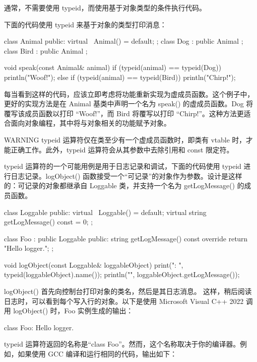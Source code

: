 通常，不需要使用 typeid，而使用基于对象类型的条件执行代码。

下面的代码使用 typeid 来基于对象的类型打印消息：

\begin{cpp}
class Animal { public: virtual ~Animal() = default; };
class Dog : public Animal {};
class Bird : public Animal {};

void speak(const Animal& animal)
{
    if (typeid(animal) == typeid(Dog)) {
        println("Woof!");
    } else if (typeid(animal) == typeid(Bird)) {
        println("Chirp!");
    }
}
\end{cpp}

每当看到这样的代码，应该立即考虑将功能重新实现为虚成员函数。这个例子中，更好的实现方法是在 Animal 基类中声明一个名为 speak() 的虚成员函数。Dog 将覆写该成员函数以打印 “Woof!”，而 Bird 将覆写以打印 “Chirp!”。这种方法更适合面向对象编程，其中将与对象相关的功能赋予对象。

\begin{myWarning}{WARNING}
typeid 运算符仅在类至少有一个虚成员函数时，即类有 vtable 时，才能正确工作。此外，typeid 运算符会从其参数中去除引用和 const 限定符。
\end{myWarning}

typeid 运算符的一个可能用例是用于日志记录和调试，下面的代码使用 typeid 进行日志记录。logObject() 函数接受一个“可记录”的对象作为参数。设计是这样的：可记录的对象都继承自 Loggable 类，并支持一个名为 getLogMessage() 的成员函数。

\begin{cpp}
class Loggable
{
    public:
        virtual ~Loggable() = default;
        virtual string getLogMessage() const = 0;
};

class Foo : public Loggable
{
    public:
        string getLogMessage() const override { return "Hello logger."; }
};

void logObject(const Loggable& loggableObject)
{
    print("{}: ", typeid(loggableObject).name());
    println("{}", loggableObject.getLogMessage());
}
\end{cpp}

logObject() 首先向控制台打印对象的类名，然后是其日志消息。 这样，稍后阅读日志时，可以看到每个写入行的对象。以下是使用 Microsoft Visual C++ 2022 调用 logObject() 时，Foo 实例生成的输出：

\begin{shell}
class Foo: Hello logger.
\end{shell}

typeid 运算符返回的名称是“class Foo”。然而，这个名称取决于你的编译器。例如，如果使用 GCC 编译和运行相同的代码，输出如下：

